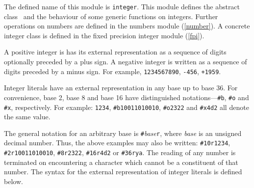 %
\begin{optDefinition}
The defined name of this module is {\tt integer}.  This module defines
the abstract class \ and the behaviour of some generic
functions on integers.  Further operations on numbers are defined in
the numbers module (\ref{number}).  A concrete integer class is
defined in the fixed precision integer module (\ref{fpi}).


A positive integer is has its
external representation as a sequence of digits optionally preceded by a plus
sign.  A negative integer is
written as a sequence of digits preceded by a minus sign.  For example,
\verb+1234567890+, \verb+-456+, \verb-+1959-.

Integer literals have an external representation in any base up to base
36.  For
convenience, base 2, base 8 and base
16 have
distinguished notations---\verb+#b+, \verb+#o+ and \verb+#x+, respectively.  For
example: \verb+1234+, \verb+#b10011010010+, \verb+#o2322+ and \verb+#x4d2+ all
denote the same value.

The general notation for an arbitrary base is
\verb+#+{\em base\/}\verb+r+, where {\em base\/} is an unsigned decimal number.
Thus, the above examples may also be written: \verb+#10r1234+,
\verb+#2r10011010010+, \verb+#8r2322+, \verb+#16r4d2+ or \verb+#36rya+.  The
reading of any number is terminated on encountering a character which cannot be
a constituent of that number.  The syntax for the external representation of
integer literals is defined below.


\end{optDefinition}
